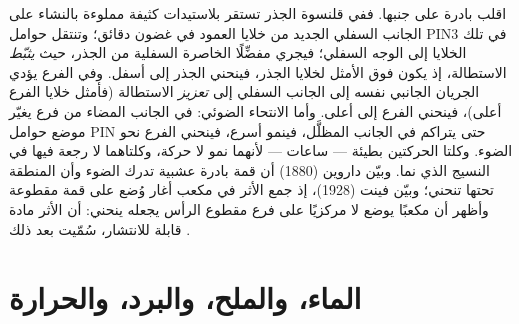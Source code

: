 \begin{example}\label{ex:b3:plant-molecular-physiology:tropism}
اقلب بادرة على جنبها. ففي قلنسوة الجذر تستقر بلاستيدات كثيفة
مملوءة بالنشاء على الجانب السفلي الجديد من خلايا العمود في
غضون دقائق؛ وتنتقل حوامل PIN3 في تلك الخلايا إلى الوجه
السفلي؛ فيجري  مفضِّلًا الخاصرة السفلية من الجذر،
حيث \emph{يثبّط} الاستطالة، إذ يكون فوق الأمثل لخلايا الجذر،
فينحني الجذر إلى أسفل. وفي الفرع يؤدي الجريان الجانبي نفسه
إلى الجانب السفلي إلى \emph{تعزيز} الاستطالة (فأمثل خلايا
الفرع أعلى)، فينحني الفرع إلى أعلى. وأما الانتحاء الضوئي:
 في الجانب المضاء من فرع يغيّر موضع حوامل PIN
حتى يتراكم  في الجانب المظلَّل، فينمو أسرع، فينحني
الفرع نحو الضوء. وكلتا الحركتين بطيئة --- ساعات --- لأنهما
نمو لا حركة، وكلتاهما لا رجعة فيها في النسيج الذي نما.
وبيّن داروين (1880) أن قمة بادرة عشبية تدرك الضوء وأن
المنطقة تحتها تنحني؛ وبيّن فينت (1928)، إذ جمع الأثر في مكعب
أغار وُضع على قمة مقطوعة وأظهر أن مكعبًا يوضع لا مركزيًا على
فرع مقطوع الرأس يجعله ينحني: أن الأثر مادة قابلة للانتشار،
سُمّيت بعد ذلك .
\end{example}

\section{الماء، والملح، والبرد، والحرارة}

